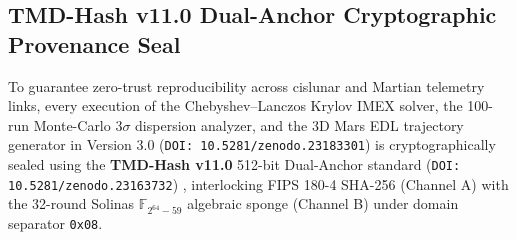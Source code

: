 \documentclass[11pt,a4paper,reqno]{article}
\theoremstyle{definition}
\theoremstyle{remark}
\begin{document}
\subsection{TMD-Hash v11.0 Dual-Anchor Cryptographic Provenance Seal}
To guarantee zero-trust reproducibility across cislunar and Martian telemetry links, every execution of the Chebyshev--Lanczos Krylov IMEX solver, the 100-run Monte-Carlo $3\sigma$ dispersion analyzer, and the 3D Mars EDL trajectory generator in Version 3.0 (\texttt{DOI: 10.5281/zenodo.23183301}) is cryptographically sealed using the \textbf{TMD-Hash v11.0} 512-bit Dual-Anchor standard (\texttt{DOI: 10.5281/zenodo.23163732}) \cite{ananda2026tmd_hash_v11}, interlocking FIPS 180-4 SHA-256 (Channel A) with the 32-round Solinas $\mathbb{F}_{2^{64}-59}$ algebraic sponge (Channel B) under domain separator \texttt{0x08}.
\end{document}
